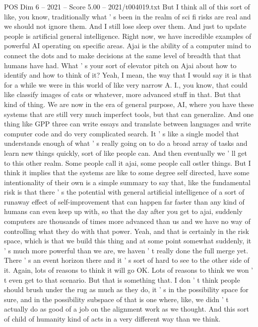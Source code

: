 \begin{textsample}{POS Dim 6 – 2021 – Score 5.00 – 2021/t004019.txt}
But I think all of this sort of like, you know, traditionally what ' s been in the realm of sci fi risks are real and we should not ignore them.
And I still lose sleep over them.
And just to update people is artificial general intelligence.
Right now, we have incredible examples of powerful AI operating on specific areas.
Ajai is the ability of a computer mind to connect the dots and to make decisions at the same level of breadth that that humans have had.
What ' s your sort of elevator pitch on Ajai about how to identify and how to think of it?
Yeah, I mean, the way that I would say it is that for a while we were in this world of like very narrow A.
I., you know, that could like classify images of cats or whatever, more advanced stuff in that.
But that kind of thing.
We are now in the era of general purpose, AI, where you have these systems that are still very much imperfect tools, but that can generalize.
And one thing like GPP three can write essays and translate between languages and write computer code and do very complicated search.
It ' s like a single model that understands enough of what ' s really going on to do a broad array of tasks and learn new things quickly, sort of like people can.
And then eventually we ' ll get to this other realm.
Some people call it ajai, some people call ostler things.
But I think it implies that the systems are like to some degree self directed, have some intentionality of their own is a simple summary to say that, like the fundamental risk is that there ' s the potential with general artificial intelligence of a sort of runaway effect of self-improvement that can happen far faster than any kind of humans can even keep up with, so that the day after you get to ajai, suddenly computers are thousands of times more advanced than us and we have no way of controlling what they do with that power.
Yeah, and that is certainly in the risk space, which is that we build this thing and at some point somewhat suddenly, it ' s much more powerful than we are, we haven ' t really done the full merge yet.
There ' s an event horizon there and it ' s sort of hard to see to the other side of it.
Again, lots of reasons to think it will go OK.
Lots of reasons to think we won ' t even get to that scenario.
But that is something that.
I don ' t think people should brush under the rug as much as they do, it ' s in the possibility space for sure, and in the possibility subspace of that is one where, like, we didn ' t actually do as good of a job on the alignment work as we thought.
And this sort of child of humanity kind of acts in a very different way than we think.

\end{textsample}

